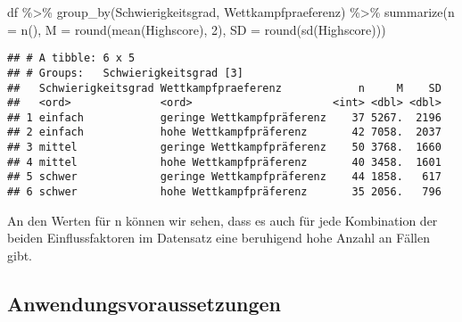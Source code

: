 \documentclass[
]{book}
\newenvironment{Shaded}{\begin{snugshade}}{\end{snugshade}}
\newcommand{\AttributeTok}[1]{\textcolor[rgb]{0.77,0.63,0.00}{#1}}
\newcommand{\DecValTok}[1]{\textcolor[rgb]{0.00,0.00,0.81}{#1}}
\newcommand{\FunctionTok}[1]{\textcolor[rgb]{0.00,0.00,0.00}{#1}}
\newcommand{\NormalTok}[1]{#1}
\newcommand{\SpecialCharTok}[1]{\textcolor[rgb]{0.00,0.00,0.00}{#1}}
\begin{document}
\begin{Shaded}
\begin{Highlighting}[]
\NormalTok{df }\SpecialCharTok{\%\textgreater{}\%} 
  \FunctionTok{group\_by}\NormalTok{(Schwierigkeitsgrad, Wettkampfpraeferenz) }\SpecialCharTok{\%\textgreater{}\%} 
  \FunctionTok{summarize}\NormalTok{(}\AttributeTok{n =} \FunctionTok{n}\NormalTok{(), }
            \AttributeTok{M =} \FunctionTok{round}\NormalTok{(}\FunctionTok{mean}\NormalTok{(Highscore), }\DecValTok{2}\NormalTok{),}
            \AttributeTok{SD =} \FunctionTok{round}\NormalTok{(}\FunctionTok{sd}\NormalTok{(Highscore)))}
\end{Highlighting}
\end{Shaded}

\begin{verbatim}
## # A tibble: 6 x 5
## # Groups:   Schwierigkeitsgrad [3]
##   Schwierigkeitsgrad Wettkampfpraeferenz            n     M    SD
##   <ord>              <ord>                      <int> <dbl> <dbl>
## 1 einfach            geringe Wettkampfpräferenz    37 5267.  2196
## 2 einfach            hohe Wettkampfpräferenz       42 7058.  2037
## 3 mittel             geringe Wettkampfpräferenz    50 3768.  1660
## 4 mittel             hohe Wettkampfpräferenz       40 3458.  1601
## 5 schwer             geringe Wettkampfpräferenz    44 1858.   617
## 6 schwer             hohe Wettkampfpräferenz       35 2056.   796
\end{verbatim}

An den Werten für n können wir sehen, dass es auch für jede Kombination der beiden Einflussfaktoren im Datensatz eine beruhigend hohe Anzahl an Fällen gibt.

\hypertarget{anwendungsvoraussetzungen-1}{%
\subsection{Anwendungsvoraussetzungen}\label{anwendungsvoraussetzungen-1}}

  
\end{document}
